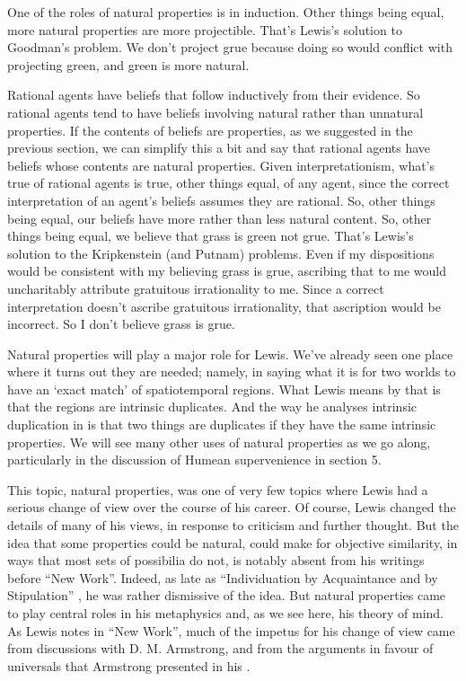 One of the roles of natural properties is in induction. Other things being equal, more natural properties are more projectible. That's Lewis's solution to Goodman's problem. We don't project grue because doing so would conflict with projecting green, and green is more natural.

Rational agents have beliefs that follow inductively from their evidence. So rational agents tend to have beliefs involving natural rather than unnatural properties. If the contents of beliefs are properties, as we suggested in the previous section, we can simplify this a bit and say that rational agents have beliefs whose contents are natural properties. Given interpretationism, what's true of rational agents is true, other things equal, of any agent, since the correct interpretation of an agent's beliefs assumes they are rational. So, other things being equal, our beliefs have more rather than less natural content. So, other things being equal, we believe that grass is green not grue. That's Lewis's solution to the Kripkenstein (and Putnam) problems. Even if my dispositions would be consistent with my believing grass is grue, ascribing that to me would uncharitably attribute gratuitous irrationality to me. Since a correct interpretation doesn't ascribe gratuitous irrationality, that ascription would be incorrect. So I don't believe grass is grue.

Natural properties will play a major role for Lewis. We've already seen one place where it turns out they are needed; namely, in saying what it is for two worlds to have an `exact match' of spatiotemporal regions. What Lewis means by that is that the regions are intrinsic duplicates. And the way he analyses intrinsic duplication in \citeyearpar{Lewis1983e} is that two things are duplicates if they have the same intrinsic properties. We will see many other uses of natural properties as we go along, particularly in the discussion of Humean supervenience in section 5.

This topic, natural properties, was one of very few topics where Lewis had a serious change of view over the course of his career. Of course, Lewis changed the details of many of his views, in response to criticism and further thought. But the idea that some properties could be natural, could make for objective similarity, in ways that most sets of possibilia do not, is notably absent from his writings before ``New Work''. Indeed, as late as ``Individuation by Acquaintance and by Stipulation'' \citeyearpar{Lewis1983c}, he was rather dismissive of the idea. But natural properties came to play central roles in his metaphysics and, as we see here, his theory of mind. As Lewis notes in ``New Work'', much of the impetus for his change of view came from discussions with D. M. Armstrong, and from the arguments in favour of universals that Armstrong presented in his \citeyearpar{Armstrong1978-Universals}.

